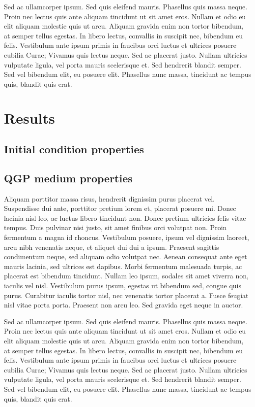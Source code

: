 \documentclass[aps,prc,reprint,amsmath,nofootinbib]{revtex4-1}
\begin{document}
Sed ac ullamcorper ipsum. Sed quis eleifend mauris. Phasellus quis massa neque. Proin nec lectus quis ante aliquam tincidunt ut sit amet eros. Nullam et odio eu elit aliquam molestie quis ut arcu. Aliquam gravida enim non tortor bibendum, at semper tellus egestas. In libero lectus, convallis in suscipit nec, bibendum eu felis. Vestibulum ante ipsum primis in faucibus orci luctus et ultrices posuere cubilia Curae; Vivamus quis lectus neque. Sed ac placerat justo. Nullam ultricies vulputate ligula, vel porta mauris scelerisque et. Sed hendrerit blandit semper. Sed vel bibendum elit, eu posuere elit. Phasellus nunc massa, tincidunt ac tempus quis, blandit quis erat. 


\section{Results}

\subsection{Initial condition properties}

\subsection{QGP medium properties}

Aliquam porttitor massa risus, hendrerit dignissim purus placerat vel. Suspendisse dui ante, porttitor pretium lorem et, placerat posuere mi. Donec lacinia nisl leo, ac luctus libero tincidunt non. Donec pretium ultricies felis vitae tempus. Duis pulvinar nisi justo, sit amet finibus orci volutpat non. Proin fermentum a magna id rhoncus. Vestibulum posuere, ipsum vel dignissim laoreet, arcu nibh venenatis neque, et aliquet dui dui a ipsum. Praesent sagittis condimentum neque, sed aliquam odio volutpat nec. Aenean consequat ante eget mauris lacinia, sed ultrices est dapibus. Morbi fermentum malesuada turpis, ac placerat est bibendum tincidunt. Nullam leo ipsum, sodales sit amet viverra non, iaculis vel nisl. Vestibulum purus ipsum, egestas ut bibendum sed, congue quis purus. Curabitur iaculis tortor nisl, nec venenatis tortor placerat a. Fusce feugiat nisl vitae porta porta. Praesent non arcu leo. Sed gravida eget neque in auctor.

Sed ac ullamcorper ipsum. Sed quis eleifend mauris. Phasellus quis massa neque. Proin nec lectus quis ante aliquam tincidunt ut sit amet eros. Nullam et odio eu elit aliquam molestie quis ut arcu. Aliquam gravida enim non tortor bibendum, at semper tellus egestas. In libero lectus, convallis in suscipit nec, bibendum eu felis. Vestibulum ante ipsum primis in faucibus orci luctus et ultrices posuere cubilia Curae; Vivamus quis lectus neque. Sed ac placerat justo. Nullam ultricies vulputate ligula, vel porta mauris scelerisque et. Sed hendrerit blandit semper. Sed vel bibendum elit, eu posuere elit. Phasellus nunc massa, tincidunt ac tempus quis, blandit quis erat. 
\end{document}
